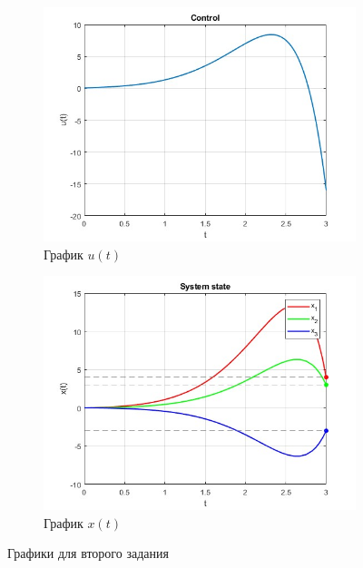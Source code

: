 \documentclass[a4paper, 12pt]{article}
\begin{document}
    \begin{figure}[H]
        \centering
        \begin{subfigure}{0.45\textwidth}
            \centering
            \includegraphics[width=\linewidth]{task_2_u_t.jpg}
            \caption{График $u(t)$}
            \label{fig:task_2_u_t}
        \end{subfigure}
        \hfill
        \begin{subfigure}{0.45\textwidth}
            \centering
            \includegraphics[width=\linewidth]{task_2_x_t.jpg}
            \caption{График $x(t)$}
            \label{fig:task_2_x_t}
        \end{subfigure}
        \caption{Графики для второго задания}
        \label{fig:task_2_modeling}
    \end{figure}
\end{document}
